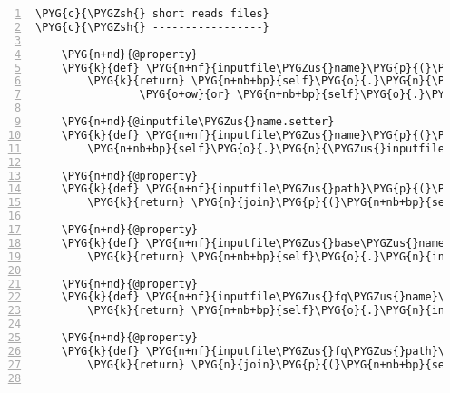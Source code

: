 \begin{Verbatim}[commandchars=\\\{\},numbers=left,firstnumber=1,stepnumber=5]
\PYG{c}{\PYGZsh{} short reads files}
\PYG{c}{\PYGZsh{} -----------------}

    \PYG{n+nd}{@property}
    \PYG{k}{def} \PYG{n+nf}{inputfile\PYGZus{}name}\PYG{p}{(}\PYG{n+nb+bp}{self}\PYG{p}{)}\PYG{p}{:}
        \PYG{k}{return} \PYG{n+nb+bp}{self}\PYG{o}{.}\PYG{n}{\PYGZus{}inputfile\PYGZus{}name} \PYGZbs{}
                \PYG{o+ow}{or} \PYG{n+nb+bp}{self}\PYG{o}{.}\PYG{n}{rnaseq\PYGZus{}run} \PYG{o+ow}{and} \PYG{n+nb+bp}{self}\PYG{o}{.}\PYG{n}{rnaseq\PYGZus{}run}\PYG{o}{.}\PYG{n}{srr} \PYG{o}{+} \PYG{l+s}{"}\PYG{l+s}{.sra}\PYG{l+s}{"}

    \PYG{n+nd}{@inputfile\PYGZus{}name.setter}
    \PYG{k}{def} \PYG{n+nf}{inputfile\PYGZus{}name}\PYG{p}{(}\PYG{n+nb+bp}{self}\PYG{p}{,} \PYG{n}{value}\PYG{p}{)}\PYG{p}{:}
        \PYG{n+nb+bp}{self}\PYG{o}{.}\PYG{n}{\PYGZus{}inputfile\PYGZus{}name} \PYG{o}{=} \PYG{n}{value}

    \PYG{n+nd}{@property}
    \PYG{k}{def} \PYG{n+nf}{inputfile\PYGZus{}path}\PYG{p}{(}\PYG{n+nb+bp}{self}\PYG{p}{)}\PYG{p}{:}
        \PYG{k}{return} \PYG{n}{join}\PYG{p}{(}\PYG{n+nb+bp}{self}\PYG{o}{.}\PYG{n}{input\PYGZus{}data\PYGZus{}dir}\PYG{p}{,} \PYG{n+nb+bp}{self}\PYG{o}{.}\PYG{n}{inputfile\PYGZus{}name}\PYG{p}{)}

    \PYG{n+nd}{@property}
    \PYG{k}{def} \PYG{n+nf}{inputfile\PYGZus{}base\PYGZus{}name}\PYG{p}{(}\PYG{n+nb+bp}{self}\PYG{p}{)}\PYG{p}{:}
        \PYG{k}{return} \PYG{n+nb+bp}{self}\PYG{o}{.}\PYG{n}{inputfile\PYGZus{}name}\PYG{o}{.}\PYG{n}{rsplit}\PYG{p}{(}\PYG{l+s}{"}\PYG{l+s}{.}\PYG{l+s}{"}\PYG{p}{,} \PYG{l+m+mi}{1}\PYG{p}{)}\PYG{p}{[}\PYG{l+m+mi}{0}\PYG{p}{]}

    \PYG{n+nd}{@property}
    \PYG{k}{def} \PYG{n+nf}{inputfile\PYGZus{}fq\PYGZus{}name}\PYG{p}{(}\PYG{n+nb+bp}{self}\PYG{p}{)}\PYG{p}{:}
        \PYG{k}{return} \PYG{n+nb+bp}{self}\PYG{o}{.}\PYG{n}{inputfile\PYGZus{}base\PYGZus{}name} \PYG{o}{+} \PYG{l+s}{"}\PYG{l+s}{.fastq}\PYG{l+s}{"}

    \PYG{n+nd}{@property}
    \PYG{k}{def} \PYG{n+nf}{inputfile\PYGZus{}fq\PYGZus{}path}\PYG{p}{(}\PYG{n+nb+bp}{self}\PYG{p}{)}\PYG{p}{:}
        \PYG{k}{return} \PYG{n}{join}\PYG{p}{(}\PYG{n+nb+bp}{self}\PYG{o}{.}\PYG{n}{input\PYGZus{}data\PYGZus{}dir}\PYG{p}{,} \PYG{n+nb+bp}{self}\PYG{o}{.}\PYG{n}{inputfile\PYGZus{}fq\PYGZus{}name}\PYG{p}{)}


\end{Verbatim}
